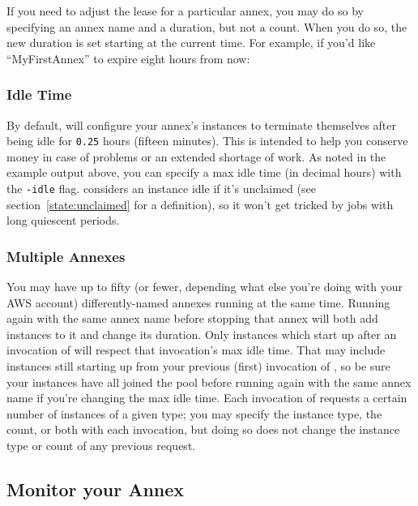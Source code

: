 \begin{samepage}
If you need to adjust the lease for a particular annex, you may do so by
specifying an annex name and a duration, but not a count.  When you do so,
the new duration is set starting at the current time.  For example, if you'd
like ``MyFirstAnnex'' to expire eight hours from now:

\end{samepage}

\subsubsection{Idle Time}

By default,  will configure your annex's instances to terminate
themselves after being idle for \texttt{0.25} hours (fifteen minutes).  This
is intended to help you conserve money in case of problems or an extended
shortage of work.  As noted in the example output above, you can specify a max
idle time (in decimal hours) with the \texttt{-idle} flag.  
considers an instance idle if it's unclaimed (see
section~\ref{state:unclaimed} for a definition), so it won't get tricked by
jobs with long quiescent periods.

\subsubsection{Multiple Annexes}

You may have up to fifty (or fewer, depending what else you're doing with your
AWS account) differently-named annexes running at the same time.  Running
 again with the same annex name before stopping that annex will
both add instances to it and change its duration.  Only instances which start
up after an invocation of  will respect that invocation's max
idle time.  That may include instances still starting up from your previous
(first) invocation of , so be sure your instances have all
joined the pool before running  again with the same annex name
if you're changing the max idle time.  Each invocation of 
requests a certain number of instances of a given type; you may specify
the instance type, the count, or both with each invocation, but doing so
does not change the instance type or count of any previous request.

\subsection{Monitor your Annex}

